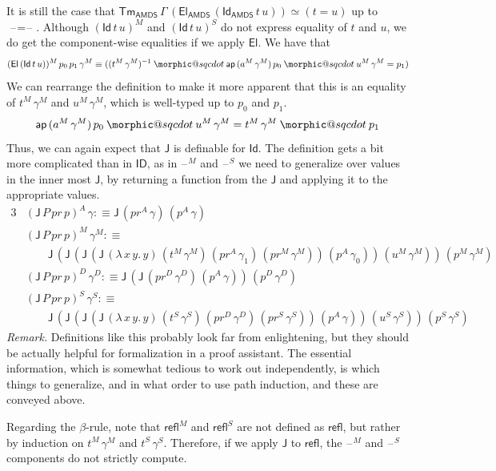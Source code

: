 \documentclass[12pt,a4paper,twoside,openany]{book}
\makeatletter
\DeclareRobustCommand{\sqcdot}{\mathbin{\mathpalette\morphic@sqcdot\relax}}
\newcommand{\morphic@sqcdot}[2]{%
  \sbox\z@{$\m@th#1\centerdot$}%
  \ht\z@=.33333\ht\z@
  \vcenter{\box\z@}%
}
\theoremstyle{remark}
\theoremstyle{definition}
\theoremstyle{theorem}
\newcommand{\mi}[1]{\mathit{#1}}
\newcommand{\ms}[1]{\mathsf{#1}}
\newcommand{\ap}{\ms{ap}}
\newcommand{\J}{\ms{J}}
\newcommand{\refl}{\mathsf{refl}}
\newcommand{\Tm}{\mathsf{Tm}}
\newcommand{\El}{\mathsf{El}}
\newcommand{\Id}{\mathsf{Id}}
\newcommand{\ID}{\mathsf{ID}}
\newcommand{\blank}{\mathord{\hspace{1pt}\text{--}\hspace{1pt}}}
\newcommand{\defn}{:\equiv}
\makeatother
\begin{document}
It is still the case that
$\Tm_{\ms{AMDS}}\,\Gamma\,(\El_{\ms{AMDS}}\,(\Id_{\ms{AMDS}}\,t\,u)) \simeq (t =
u)$ up to $\blank\!=\!\blank$. Although $(\Id\,t\,u)^M$ and $(\Id\,t\,u)^S$ do
not express equality of $t$ and $u$, we do get the component-wise equalities if
we apply $\El$. We have that
\[
(\El\,(\Id\,t\,u))^M\,p_0\,p_1\,\gamma^M
\equiv ((t^M\,\gamma^M)^{-1} \sqcdot \ap\,(a^M\,\gamma^M)\,p_0 \sqcdot u^M\,\gamma^M = p_1)
\]
We can rearrange the definition to make it more apparent that this is an equality
of $t^M\,\gamma^M$ and $u^M\,\gamma^M$, which is well-typed up to $p_0$ and $p_1$.
\[
  \ap\,(a^M\,\gamma^M)\,p_0 \sqcdot u^M\,\gamma^M = t^M\,\gamma^M \sqcdot p_1
\]
Thus, we can again expect that $\J$ is definable for $\Id$. The definition gets
a bit more complicated than in $\ID$, as in $\blank^M$ and $\blank^S$ we need to generalize
over values in the inner most $\J$, by returning a function from the $\J$ and
applying it to the appropriate values.
\begin{alignat*}{3}
  &(\J\,P\,\mi{pr}\,p)^A\,\gamma   \defn \J\,(\mi{pr}^A\,\gamma)\,(p^A\,\gamma)\\
  &(\J\,P\,\mi{pr}\,p)^M\,\gamma^M \defn\\
  &\hspace{2em}\J\,(\J\,(\J\,(\J\,(\lambda\,x\,y.\,y)\,(t^M\,\gamma^M)\,(\mi{pr}^A\,\gamma_1)\,(\mi{pr}^M\,\gamma^M))\,(p^A\,\gamma_0))\,(u^M\,\gamma^M))\,(p^M\,\gamma^M)\\
  &(\J\,P\,\mi{pr}\,p)^D\,\gamma^D \defn \J\,(\J\,(\mi{pr}^D\,\gamma^D)\,(p^A\,\gamma))\,(p^D\,\gamma^D)\\
  &(\J\,P\,\mi{pr}\,p)^S\,\gamma^S \defn\\
  &\hspace{2em}\J\,(\J\,(\J\,(\J\,(\lambda\,x\,y.\,y)\,(t^S\,\gamma^S)\,(\mi{pr}^D\,\gamma^D)\,(\mi{pr}^S\,\gamma^S))\,(p^A\,\gamma))\,(u^S\,\gamma^S))\,(p^S\,\gamma^S)
\end{alignat*}
\emph{Remark.} Definitions like this probably look far from enlightening, but
they should be actually helpful for formalization in a proof assistant. The
essential information, which is somewhat tedious to work out independently, is
which things to generalize, and in what order to use path induction, and these
are conveyed above.

Regarding the $\beta$-rule, note that $\refl^M$ and $\refl^S$ are not defined as
$\refl$, but rather by induction on $t^M\,\gamma^M$ and
$t^S\,\gamma^S$. Therefore, if we apply $\J$ to $\refl$, the $\blank^M$ and
$\blank^S$ components do not strictly compute.
\end{document}
